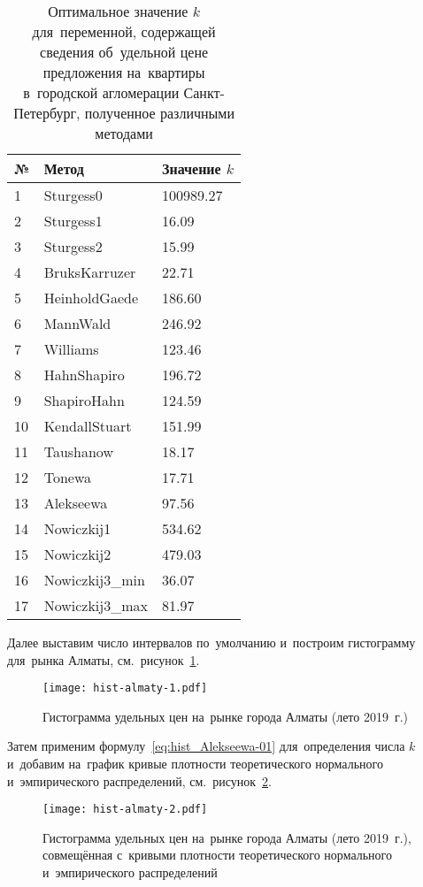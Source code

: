 \documentclass[]{scrartcl}
\begin{document}
\begin{table}[ht]
	\caption{Оптимальное значение $k$ для~переменной, содержащей сведения об~удельной цене предложения на~квартиры в~городской агломерации Санкт-Петербург, полученное различными методами} \label{tab:k-hist-optimal-spba}
	\centering%
	\begin{tabularx}{\textwidth}{lXX} 
		\hline
		№  & Метод & Значение $k$ 
		\\ \hline \hline
		1 & Sturgess0 & 100989.27 \\ 
		2 & Sturgess1 & 16.09 \\ 
		3 & Sturgess2 & 15.99 \\ 
		4 & BruksKarruzer & 22.71 \\ 
		5 & HeinholdGaede & 186.60 \\ 
		6 & MannWald & 246.92 \\ 
		7 & Williams & 123.46 \\ 
		8 & HahnShapiro & 196.72 \\ 
		9 & ShapiroHahn & 124.59 \\ 
		10 & KendallStuart & 151.99 \\ 
		11 & Taushanow & 18.17 \\ 
		12 & Tonewa & 17.71 \\ 
		13 & Alekseewa & 97.56 \\ 
		14 & Nowiczkij1 & 534.62 \\ 
		15 & Nowiczkij2 & 479.03 \\ 
		16 & Nowiczkij3\_min & 36.07 \\ 
		17 & Nowiczkij3\_max & 81.97 \\
		\hline	
	\end{tabularx}
\end{table}

Далее выставим число интервалов по~умолчанию и~построим гистограмму для~рынка Алматы, см.~рисунок~\ref{fig:hist-almaty-1}.

\begin{figure}[ht]
	\centering %
	\texttt{[image: hist-almaty-1.pdf]}
	\caption{Гистограмма удельных цен на~рынке города Алматы (лето 2019~г.)}\label{fig:hist-almaty-1}
\end{figure}

Затем применим формулу~\ref{eq:hist_Alekseewa-01} для~определения числа $k$ и~добавим на~график кривые плотности теоретического нормального и~эмпирического распределений, см.~рисунок~\ref{fig:hist-almaty-2}.

\begin{figure}[ht]
	\centering %
	\texttt{[image: hist-almaty-2.pdf]}
	\caption{Гистограмма удельных цен на~рынке города Алматы (лето 2019~г.), совмещённая с~кривыми плотности теоретического нормального и~эмпирического распределений}\label{fig:hist-almaty-2}
\end{figure}
\end{document}
